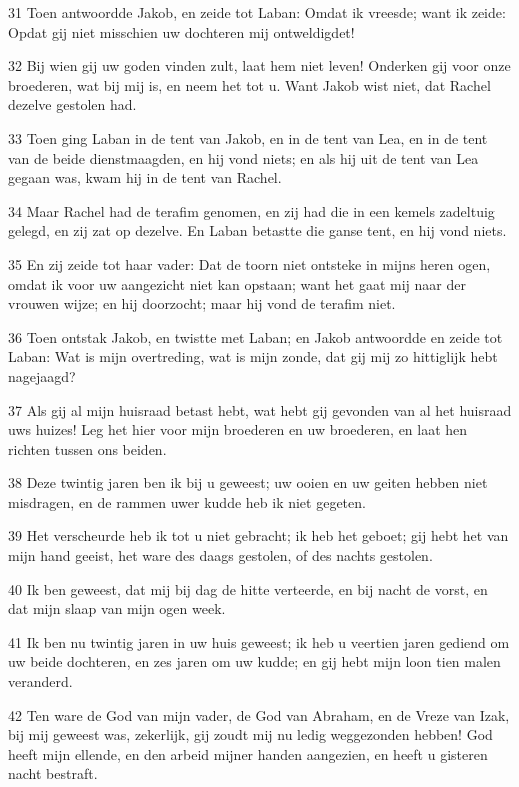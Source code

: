 \par 31 Toen antwoordde Jakob, en zeide tot Laban: Omdat ik vreesde; want ik zeide: Opdat gij niet misschien uw dochteren mij ontweldigdet!
\par 32 Bij wien gij uw goden vinden zult, laat hem niet leven! Onderken gij voor onze broederen, wat bij mij is, en neem het tot u. Want Jakob wist niet, dat Rachel dezelve gestolen had.
\par 33 Toen ging Laban in de tent van Jakob, en in de tent van Lea, en in de tent van de beide dienstmaagden, en hij vond niets; en als hij uit de tent van Lea gegaan was, kwam hij in de tent van Rachel.
\par 34 Maar Rachel had de terafim genomen, en zij had die in een kemels zadeltuig gelegd, en zij zat op dezelve. En Laban betastte die ganse tent, en hij vond niets.
\par 35 En zij zeide tot haar vader: Dat de toorn niet ontsteke in mijns heren ogen, omdat ik voor uw aangezicht niet kan opstaan; want het gaat mij naar der vrouwen wijze; en hij doorzocht; maar hij vond de terafim niet.
\par 36 Toen ontstak Jakob, en twistte met Laban; en Jakob antwoordde en zeide tot Laban: Wat is mijn overtreding, wat is mijn zonde, dat gij mij zo hittiglijk hebt nagejaagd?
\par 37 Als gij al mijn huisraad betast hebt, wat hebt gij gevonden van al het huisraad uws huizes! Leg het hier voor mijn broederen en uw broederen, en laat hen richten tussen ons beiden.
\par 38 Deze twintig jaren ben ik bij u geweest; uw ooien en uw geiten hebben niet misdragen, en de rammen uwer kudde heb ik niet gegeten.
\par 39 Het verscheurde heb ik tot u niet gebracht; ik heb het geboet; gij hebt het van mijn hand geeist, het ware des daags gestolen, of des nachts gestolen.
\par 40 Ik ben geweest, dat mij bij dag de hitte verteerde, en bij nacht de vorst, en dat mijn slaap van mijn ogen week.
\par 41 Ik ben nu twintig jaren in uw huis geweest; ik heb u veertien jaren gediend om uw beide dochteren, en zes jaren om uw kudde; en gij hebt mijn loon tien malen veranderd.
\par 42 Ten ware de God van mijn vader, de God van Abraham, en de Vreze van Izak, bij mij geweest was, zekerlijk, gij zoudt mij nu ledig weggezonden hebben! God heeft mijn ellende, en den arbeid mijner handen aangezien, en heeft u gisteren nacht bestraft.
